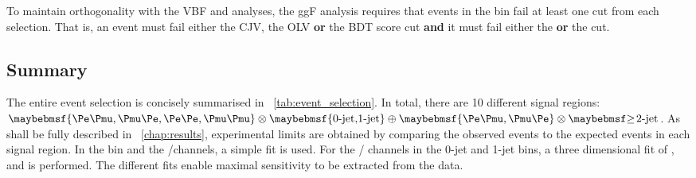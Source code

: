 To maintain orthogonality with the VBF and \VH analyses, the ggF analysis requires that 
events in the \twojet bin fail at least one cut from each selection. That is, an event 
must fail either the CJV, the OLV \textbf{or} the BDT score cut \textbf{and} it must fail 
either the \dyjj \textbf{or} the \mjj cut.



\subsection{Summary}
\label{sec:selection:summary}

The entire event selection is concisely summarised in \Table~\ref{tab:event_selection}. 
In total, there are 10 different signal regions: $\braces{\emch,\mech,\eech,\mmch} 
\otimes \braces{\text{0-jet,1-jet}} \oplus \braces{\emch,\mech} \otimes \twojet$. As 
shall be fully described in \Chapter~\ref{chap:results}, experimental limits are obtained 
by comparing the observed events to the expected events in each signal region. In the 
\twojet bin and the \eech/\mmch channels, a simple \mt fit is used. For the \emch/\mech 
channels in the 0-jet and 1-jet bins, a three dimensional fit of \mt, \mll and 
\ptsubleadlep is performed. The different fits enable maximal sensitivity to be extracted 
from the data.

